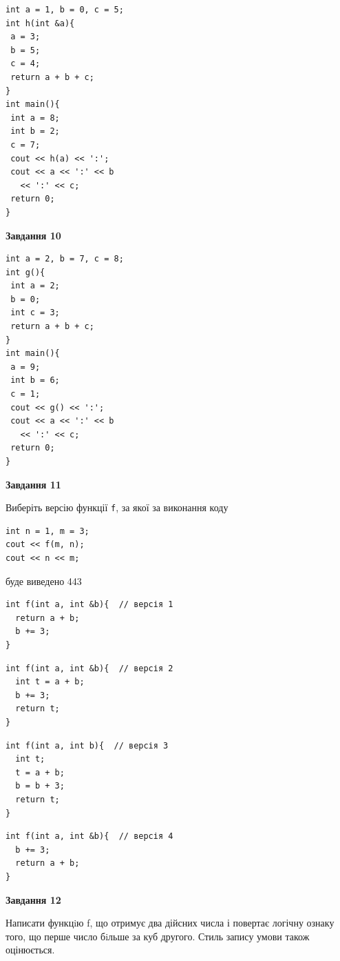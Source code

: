 \documentclass[12pt, ukrainian]{article}
\def\code#1{\Verb!#1!}
\begin{document}
{\begin {large}
\begin{minipage}[t]{7.0cm}
\begin{verbatim}
int a = 1, b = 0, c = 5;
int h(int &a){
 a = 3;
 b = 5;
 c = 4;
 return a + b + c;
}
int main(){
 int a = 8;
 int b = 2;
 c = 7;
 cout << h(a) << ':';
 cout << a << ':' << b 
   << ':' << c;
 return 0;
}
\end{verbatim}



\begin{center}
\textbf{Завдання 10}
\end{center}
\vspace{-8mm}

\begin{verbatim}
int a = 2, b = 7, c = 8;
int g(){
 int a = 2;
 b = 0;
 int c = 3;
 return a + b + c;
}
int main(){
 a = 9;
 int b = 6;
 c = 1;
 cout << g() << ':';
 cout << a << ':' << b 
   << ':' << c;
 return 0;
}
\end{verbatim}

\end{minipage}
\vline \hspace{1mm}
\begin{minipage}[t]{11.0cm}

\begin{center}
\textbf{Завдання 11}
\end{center}
Виберіть версію функції \code{f}, за якої за виконання коду
\begin{verbatim}
int n = 1, m = 3;
cout << f(m, n);
cout << n << m;
\end{verbatim}

буде виведено 443

\begin{verbatim}
int f(int a, int &b){  // версія 1
  return a + b;
  b += 3;
}
\end{verbatim}

\vspace{-8mm}\begin{verbatim}
int f(int a, int &b){  // версія 2
  int t = a + b;
  b += 3;
  return t;
}
\end{verbatim}

\vspace{-8mm}\begin{verbatim}
int f(int a, int b){  // версія 3
  int t;
  t = a + b;
  b = b + 3;
  return t;
}
\end{verbatim}

\vspace{-8mm}\begin{verbatim}
int f(int a, int &b){  // версія 4
  b += 3;
  return a + b;
}
\end{verbatim}



\begin{center}
\textbf{Завдання 12}
\end{center}

Написати функцiю f, що отримує два дійсних числа і повертає логічну ознаку того, що перше число бiльше за куб другого. Стиль запису умови також оцінюється.\par

\end{minipage}

\end {large}}
\end{document}
